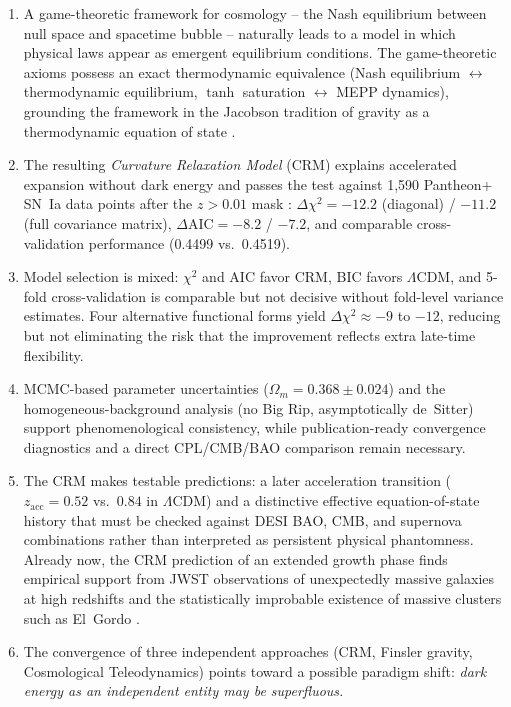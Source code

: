 \documentclass[aps,prd,twocolumn,superscriptaddress,nofootinbib]{revtex4-2}
\begin{document}
\begin{enumerate}
\item A game-theoretic framework for cosmology -- the Nash equilibrium between null space and spacetime bubble -- naturally leads to a model in which physical laws appear as emergent equilibrium conditions. The game-theoretic axioms possess an exact thermodynamic equivalence (Nash equilibrium $\leftrightarrow$ thermodynamic equilibrium, $\tanh$ saturation $\leftrightarrow$ MEPP dynamics), grounding the framework in the Jacobson tradition of gravity as a thermodynamic equation of state \cite{Jacobson1995}.
\item The resulting \textit{Curvature Relaxation Model} (CRM) explains accelerated expansion without dark energy and passes the test against 1,590 Pantheon+ SN~Ia data points after the $z>0.01$ mask \cite{Scolnic2022}: $\Delta\chi^2 = -12.2$ (diagonal) / $-11.2$ (full covariance matrix), $\Delta\mathrm{AIC} = -8.2$ / $-7.2$, and comparable cross-validation performance (0.4499 vs.\ 0.4519).
\item Model selection is mixed: $\chi^2$ and AIC favor CRM, BIC favors $\Lambda$CDM, and 5-fold cross-validation is comparable but not decisive without fold-level variance estimates. Four alternative functional forms yield $\Delta\chi^2 \approx -9$ to $-12$, reducing but not eliminating the risk that the improvement reflects extra late-time flexibility.
\item MCMC-based parameter uncertainties ($\Omega_m = 0.368 \pm 0.024$) and the homogeneous-background analysis (no Big Rip, asymptotically de~Sitter) support phenomenological consistency, while publication-ready convergence diagnostics and a direct CPL/CMB/BAO comparison remain necessary.
\item The CRM makes testable predictions: a later acceleration transition ($z_{\mathrm{acc}} = 0.52$ vs.\ $0.84$ in $\Lambda$CDM) and a distinctive effective equation-of-state history that must be checked against DESI BAO, CMB, and supernova combinations rather than interpreted as persistent physical phantomness. Already now, the CRM prediction of an extended growth phase finds empirical support from JWST observations of unexpectedly massive galaxies at high redshifts \cite{Labbe2023, BoylanKolchin2023} and the statistically improbable existence of massive clusters such as El~Gordo \cite{Asencio2023}.
\item The convergence of three independent approaches (CRM, Finsler gravity, Cosmological Teleodynamics) points toward a possible paradigm shift: \textit{dark energy as an independent entity may be superfluous.}
\end{enumerate}
\end{document}
